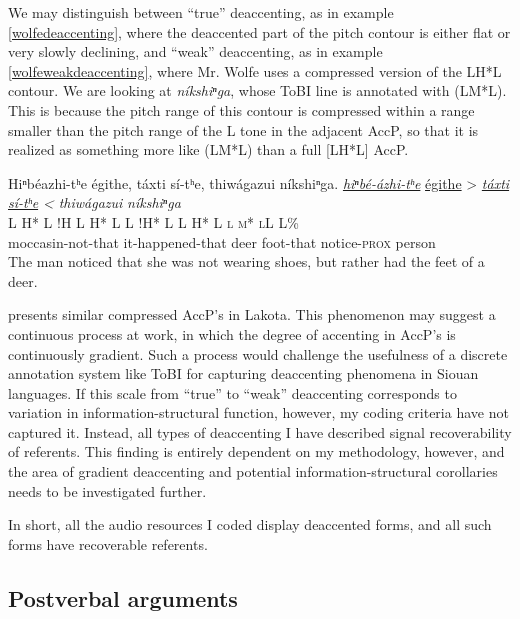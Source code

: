 \documentclass[output=paper]{LSP/langsci}
\begin{document}
We may distinguish between “true” deaccenting, as in example \ref{wolfedeaccenting}, where the deaccented part of the pitch contour is either flat or very slowly declining, and “weak” deaccenting, as in example \ref{wolfeweakdeaccenting}, where Mr. Wolfe uses a compressed version of the LH*L contour. We are looking at \textit{níkshiⁿga}, whose ToBI line is annotated with (LM*L). This is because the pitch range of this contour is compressed within a range smaller than the pitch range of the L tone in the adjacent AccP, so that it is realized as something more like (LM*L) than a full [LH*L] AccP.

\ea\label{wolfeweakdeaccenting}
Hiⁿbéazhi-tʰe égithe, táxti sí-tʰe, thiwágazui níkshiⁿga.\footnotemark
\glll	\emph{\underline{hiⁿbé-ázhi-tʰe}}	{\underline{égithe} >}				\emph{\underline{táxti}}		\emph{\underline{sí-tʰe} <}		\emph{thiwágazui}	\emph{níkshiⁿga}\\
	{\ob L H* L}					{\cb{}!H}	{\ob L H* L\cb}			{\ob L !H* L\cb}				{\ob L H* L}			{\op \textsc{l m* l}\cp\cb{}L L\%}\\
	moccasin-not-that				it-happened-that					deer					foot-that				notice-\textsc{prox}		person\\
\glt	The man noticed that she was not wearing shoes, but rather had the feet of a deer.
\z

\citet[121--123]{Mirzayan2011} presents similar compressed AccP’s in Lakota. This phenomenon may suggest a continuous process at work, in which the degree of accenting in AccP’s is continuously gradient. Such a process would challenge the usefulness of a discrete annotation system like ToBI for capturing deaccenting phenomena in Siouan languages. If this scale from “true” to “weak” deaccenting corresponds to variation in information-structural function, however, my coding criteria have not captured it. Instead, all types of deaccenting I have described signal recoverability of referents. This finding is entirely dependent on my methodology, however, and the area of gradient deaccenting and potential information-structural corollaries needs to be investigated further.

In short, all the audio resources I coded display deaccented forms, and all such forms have recoverable referents.

\subsection{Postverbal arguments}\label{postverbalarguments}
\end{document}
